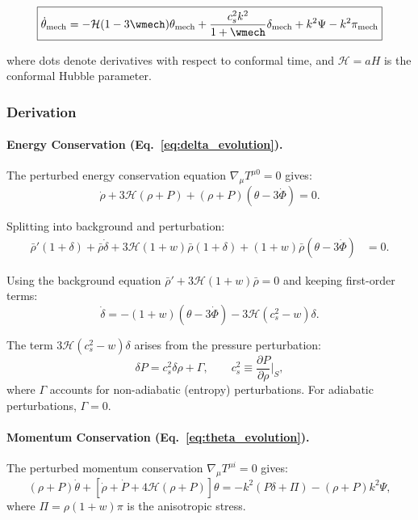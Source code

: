 \begin{equation}
\label{eq:theta_evolution}
\boxed{\dot{\theta}_{\mathrm{mech}} = -\mathcal{H}(1-3\wmech)\theta_{\mathrm{mech}} + \frac{c_s^2 k^2}{1+\wmech}\delta_{\mathrm{mech}} + k^2\Psi - k^2\pi_{\mathrm{mech}}}
\end{equation}

where dots denote derivatives with respect to conformal time, and $\mathcal{H} = aH$ is the conformal Hubble parameter.

\subsubsection{Derivation}

\paragraph{Energy Conservation (Eq.~\ref{eq:delta_evolution}).}
The perturbed energy conservation equation $\nabla_\mu T^{\mu 0} = 0$ gives:
\begin{equation}
\dot{\rho} + 3\mathcal{H}(\rho + P) + (\rho + P)(\theta - 3\dot{\Phi}) = 0.
\end{equation}

Splitting into background and perturbation:
\begin{align}
\bar{\rho}'(1 + \delta) + \bar{\rho}\dot{\delta} + 3\mathcal{H}(1+w)\bar{\rho}(1+\delta) + (1+w)\bar{\rho}(\theta - 3\dot{\Phi}) &= 0.
\end{align}

Using the background equation $\bar{\rho}' + 3\mathcal{H}(1+w)\bar{\rho} = 0$ and keeping first-order terms:
\begin{equation}
\dot{\delta} = -(1+w)(\theta - 3\dot{\Phi}) - 3\mathcal{H}(c_s^2 - w)\delta.
\end{equation}

The term $3\mathcal{H}(c_s^2 - w)\delta$ arises from the pressure perturbation:
\begin{equation}
\delta P = c_s^2 \delta\rho + \Gamma, \qquad c_s^2 \equiv \frac{\partial P}{\partial\rho}\bigg|_S,
\end{equation}
where $\Gamma$ accounts for non-adiabatic (entropy) perturbations. For adiabatic perturbations, $\Gamma = 0$.

\paragraph{Momentum Conservation (Eq.~\ref{eq:theta_evolution}).}
The perturbed momentum conservation $\nabla_\mu T^{\mu i} = 0$ gives:
\begin{equation}
(\rho+P)\dot{\theta} + [\dot{\rho} + \dot{P} + 4\mathcal{H}(\rho+P)]\theta = -k^2(P\delta + \Pi) - (\rho+P)k^2\Psi,
\end{equation}
where $\Pi = \rho(1+w)\pi$ is the anisotropic stress.

